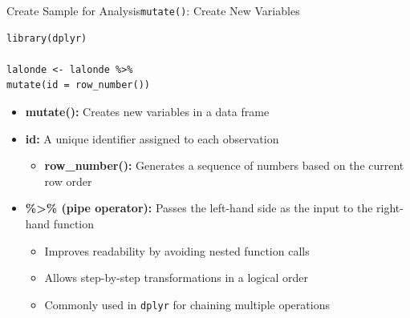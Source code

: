 \documentclass[dvipsnames,hyperref={pdfpagelabels=false}]{beamer}
\begin{document}
\begin{frame}[fragile]{Create Sample for Analysis}{\texttt{mutate()}: Create New Variables}
\begin{lstlisting}
library(dplyr)

lalonde <- lalonde %>%
mutate(id = row_number())
\end{lstlisting}
\begin{itemize}
	\vspace{0.2cm}
	\item \textbf{mutate():} Creates new variables in a data frame
	\vspace{0.2cm}
	\item \textbf{id:} A unique identifier assigned to each observation
	\vspace{0.2cm}
	\begin{itemize}
		\item \textbf{row\_number():} Generates a sequence of numbers based on the current row order
	\end{itemize}
	\vspace{0.2cm}
	\item \textbf{\%>\% (pipe operator):} Passes the left-hand side as the input to the right-hand function
	\vspace{0.2cm}
	\begin{itemize}
		\item Improves readability by avoiding nested function calls
		\vspace{0.2cm}
		\item Allows step-by-step transformations in a logical order
		\vspace{0.2cm}
		\item Commonly used in \texttt{dplyr} for chaining multiple operations
	\end{itemize}
\end{itemize}
\end{frame}
\end{document}

